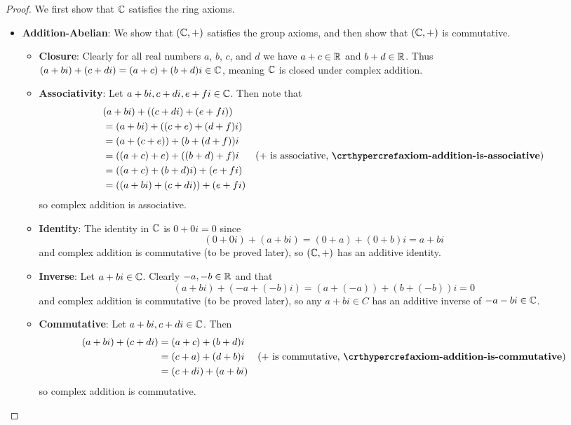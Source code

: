 \begin{proof}
    We first show that $\mathbb{C}$ satisfies the ring axioms.
    \begin{itemize}
        \item \textbf{Addition-Abelian}: We show that $(\mathbb{C}, +)$ satisfies the group axioms, and then show that $(\mathbb{C}, +)$ is commutative.
        \begin{itemize}
            \item \textbf{Closure}: Clearly for all real numbers $a$, $b$, $c$, and $d$ we have $a + c \in \mathbb{R}$ and $b+d \in \mathbb{R}$. Thus $(a+bi) + (c+di) = (a+c) + (b+d)i \in \mathbb{C}$, meaning $\mathbb{C}$ is closed under complex addition.
            
            \item \textbf{Associativity}: Let $a+bi, c+di, e+fi \in \mathbb{C}$. Then note that
            \begin{align*}
                &(a+bi) + ((c+di) + (e+fi))\\
                &= (a+bi) + ((c+e) + (d+f)i)\\
                &= (a+(c+e)) + (b+(d+f))i\\
                &= ((a+c)+e) + ((b+d)+f)i & (+ \text{ is associative, }\myref{axiom-addition-is-associative})\\
                &= ((a+c) + (b+d)i) + (e+fi)\\
                &= ((a+bi) + (c+di)) + (e+fi)
            \end{align*}
            so complex addition is associative.
            
            \item \textbf{Identity}: The identity in $\mathbb{C}$ is $0 + 0i = 0$ since
            \[
                (0+0i) + (a+bi) = (0+a) + (0+b)i = a+bi
            \]
            and complex addition is commutative (to be proved later), so $(\mathbb{C},+)$ has an additive identity.
            
            \item \textbf{Inverse}: Let $a+bi \in \mathbb{C}$. Clearly $-a, -b \in \mathbb{R}$ and that
            \[
                (a+bi) + (-a+(-b)i)= (a+(-a)) + (b+(-b))i = 0
            \]
            and complex addition is commutative (to be proved later), so any $a+bi\in C$ has an additive inverse of $-a-bi \in \mathbb{C}$.

            \item \textbf{Commutative}: Let $a+bi, c+di \in \mathbb{C}$. Then
            \begin{align*}
                (a+bi) + (c+di) &= (a+c) + (b+d)i\\
                &= (c+a) + (d+b)i & (+\text{ is commutative, } \myref{axiom-addition-is-commutative})\\
                &= (c+di) + (a+bi)
            \end{align*}
            so complex addition is commutative.
        \end{itemize}
        

\end{itemize}
\end{proof}
